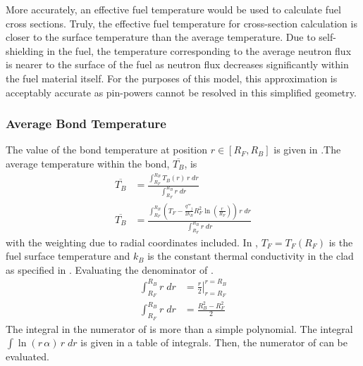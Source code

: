       More accurately, an effective fuel temperature
      would be used to calculate fuel cross sections. Truly, the effective
      fuel temperature for cross-section calculation is closer to the
      surface temperature than the average temperature. Due to
      self-shielding in the fuel, the temperature corresponding to the average
      neutron flux is nearer to the surface of the fuel as neutron flux
      decreases significantly within the fuel material itself. For the purposes
      of this model, this approximation is acceptably accurate as pin-powers
      cannot be resolved in this simplified geometry.

    \subsubsection{Average Bond Temperature}
      \label{sec:average_bond_temp}
      The value of the bond temperature at position $r \in [R_F,R_B]$
      is given in .The average temperature within the bond,
      $\overline{T_B}$, is 
      \begin{align}
        \overline{T_B} &= \frac{\int_{R_F}^{R_B} T_B(r) \, r \; dr}
          {\int_{R_F}^{R_B} r \; dr} \\
        \label{eq:tbbar_integral}
        \overline{T_B} &= \frac{\int_{R_F}^{R_B} \left( T_F -
          \frac{q'''_j}{2 k_B} R_F^2 \ln\left(\frac{r}{R_F}\right) \right)
          \, r \; dr} {\int_{R_F}^{R_B} r \; dr}
      \end{align}
      with the weighting due to radial coordinates included.
      In , $T_F = T_F(R_F)$ is the fuel surface
      temperature and $k_B$ is the constant thermal conductivity in the clad as
      specified in .
      Evaluating the denominator of .
      \begin{align}
        \int_{R_F}^{R_B} r \; dr &= \left. \frac{r}{2} \right|_{r=R_F}^{r=R_B}\\
        \label{eq:tbbar_denominator}
        \int_{R_F}^{R_B} r \; dr &= \frac{R_B^2 - R_F^2}{2}
      \end{align}
      The integral in the numerator of  is more than a
      simple polynomial. The integral $\int \ln(r \, \alpha) \, r \; dr$ is
      given in a table of integrals. Then, the numerator of 
       can be evaluated. 

